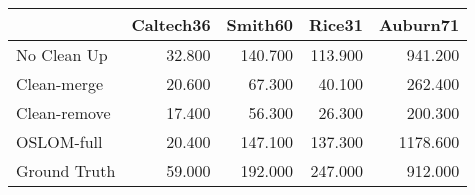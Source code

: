\begin{tabular}{lrrrr}
\toprule
{} & Caltech36 & Smith60 &  Rice31 & Auburn71 \\
\midrule
No Clean Up  &    32.800 & 140.700 & 113.900 &  941.200 \\
Clean-merge  &    20.600 &  67.300 &  40.100 &  262.400 \\
Clean-remove &    17.400 &  56.300 &  26.300 &  200.300 \\
OSLOM-full   &    20.400 & 147.100 & 137.300 & 1178.600 \\
Ground Truth &    59.000 & 192.000 & 247.000 &  912.000 \\
\bottomrule
\end{tabular}
